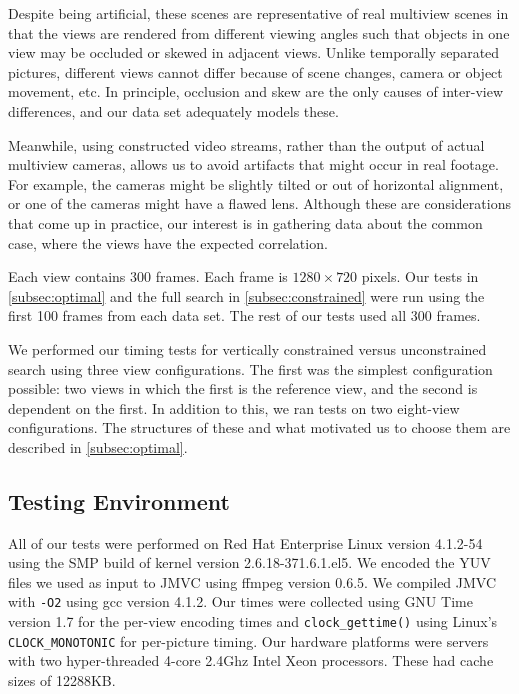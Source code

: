 \documentclass{sig-alternate-05-2015}
\begin{document}
Despite being artificial, these scenes are representative of real multiview
scenes in that the views are rendered from different viewing angles such that
objects in one view may be occluded or skewed in adjacent views. Unlike
temporally separated pictures, different views cannot differ because of scene
changes, camera or object movement, etc. In principle, occlusion and skew are
the only causes of inter-view differences, and our data set adequately models
these.

Meanwhile, using constructed video streams, rather than the output of actual
multiview cameras, allows us to avoid artifacts that might occur in real
footage. For example, the cameras might be slightly tilted or out of horizontal
alignment, or one of the cameras might have a flawed lens. Although these are
considerations that come up in practice, our interest is in gathering data about
the common case, where the views have the expected correlation.

Each view contains 300 frames. Each frame is $1280\times 720$ pixels. Our tests
in \ref{subsec:optimal} and the full search in \ref{subsec:constrained} were run
using the first 100 frames from each data set. The rest of our tests used all
300 frames.

We performed our timing tests for vertically constrained versus unconstrained
search using three view configurations. The first was the simplest configuration
possible: two views in which the first is the reference view, and the second
is dependent on the first. In addition to this, we ran tests on two eight-view
configurations. The structures of these and what motivated us to choose them
are described in \ref{subsec:optimal}.

\subsection{Testing Environment} %
\label{subsec:environment} %
All of our tests were performed on Red Hat Enterprise Linux version 4.1.2-54
using the SMP build of kernel version 2.6.18-371.6.1.el5. We encoded the YUV
files we used as input to JMVC using ffmpeg version 0.6.5. We compiled JMVC
with {\tt -O2} using gcc version 4.1.2. Our times were collected using GNU Time
version 1.7 for the per-view encoding times and {\tt clock\_gettime()} using
Linux's {\tt CLOCK\_MONOTONIC} for per-picture timing. Our hardware platforms
were servers with two hyper-threaded 4-core 2.4Ghz Intel Xeon processors. These
had cache sizes of 12288KB.
\end{document}
